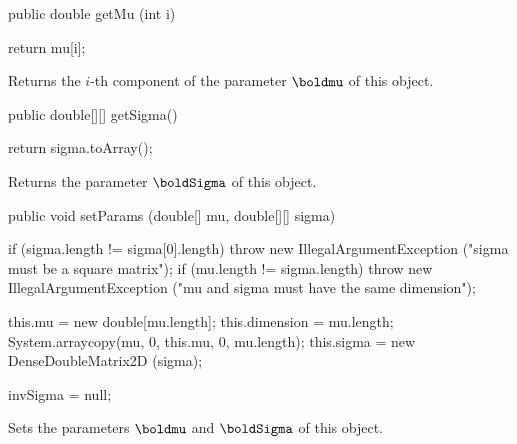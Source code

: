 \begin{code}

   public double getMu (int i)\begin{hide} {
      return mu[i];
   }\end{hide}
\end{code}
\begin{tabb}
   Returns the $i$-th component of the parameter $\boldmu$ of this object.
\end{tabb}
\begin{code}

   public double[][] getSigma()\begin{hide} {
      return sigma.toArray();
   }\end{hide}
\end{code}
\begin{tabb}
   Returns the parameter $\boldSigma$ of this object.
\end{tabb}
\begin{code}

   public void setParams (double[] mu, double[][] sigma)\begin{hide} {
      if (sigma.length != sigma[0].length)
         throw new IllegalArgumentException ("sigma must be a square matrix");
      if (mu.length != sigma.length)
         throw new IllegalArgumentException ("mu and sigma must have the same dimension");

      this.mu = new double[mu.length];
      this.dimension = mu.length;
      System.arraycopy(mu, 0, this.mu, 0, mu.length);
      this.sigma = new DenseDoubleMatrix2D (sigma);

      invSigma = null;
   }\end{hide}
\end{code}
\begin{tabb}
   Sets the parameters $\boldmu$ and $\boldSigma$ of this object.
\end{tabb}
\begin{code}\begin{hide}
}\end{hide}
\end{code}
